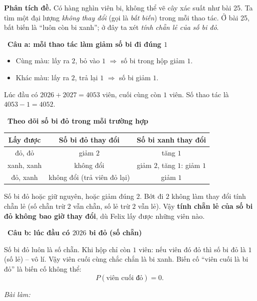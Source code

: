 \documentclass[11pt]{article}
\newif\ifsol \solfalse
\newcommand{\StuProb}[2]{\begin{probboxS}{#1}{#2}\StuProbBody\end{probboxS}}
\newcommand{\probsol}[1]{%
  \begin{lrbox}{\solmeasure}\begin{minipage}{\dimexpr\linewidth-24pt\relax}#1\end{minipage}\end{lrbox}%
  \ifsol
    \begin{solbox}#1\end{solbox}%
  \else
    \setlength{\solht}{\dimexpr\ht\solmeasure+\dp\solmeasure+0.85cm\relax}%
    \ifdim\solht<1.35cm\setlength{\solht}{1.35cm}\fi
    \ifdim\solht>\StudentMaxWork\setlength{\solht}{\StudentMaxWork}\fi
    \par\noindent\begin{minipage}{\linewidth}%
    \expandafter\StuProb\StuProbArgs
    \begin{tcolorbox}[colback=white,colframe=Line,boxrule=0.8pt,arc=5pt,
      left=8pt,right=8pt,top=4pt,bottom=4pt,height=\solht]{\footnotesize\color{Slate}\itshape\WorkWord}\end{tcolorbox}%
    \end{minipage}\par\medskip
  \fi}
\newlength{\StudentMaxWork}\setlength{\StudentMaxWork}{4.5cm}
\newcommand{\step}[2]{\par\smallskip\noindent{\bfseries\color{tmBlue!85!black}\StepWord~#1.}\ {\bfseries #2}\par\nopagebreak}
\def\WorkWord{Bài làm:}
\def\StepWord{Bước}
\begin{document}
\probsol{
\textbf{Phân tích đề.} Có hàng nghìn viên bi, không thể vẽ cây xác suất như bài 25. Ta tìm một đại lượng \emph{không thay đổi} (gọi là
\emph{bất biến}) trong mỗi thao tác. Ở bài 25, bất biến là ``luôn còn bi xanh''; ở đây ta xét \emph{tính chẵn lẻ của số bi đỏ}.

\step{1}{Câu a: mỗi thao tác làm giảm số bi đi đúng $1$}
\begin{itemize}[leftmargin=1.2em,itemsep=1pt,topsep=2pt]
\item Cùng màu: lấy ra $2$, bỏ vào $1$ $\Rightarrow$ số bi trong hộp giảm $1$.
\item Khác màu: lấy ra $2$, trả lại $1$ $\Rightarrow$ số bi giảm $1$.
\end{itemize}
Lúc đầu có $2026+2027=4053$ viên, cuối cùng còn $1$ viên. Số thao tác là $4053-1=4052$.

\step{2}{Theo dõi số bi đỏ trong mỗi trường hợp}
\begin{center}\begin{tabular}{|c|c|c|}\hline
Lấy được & Số bi đỏ thay đổi & Số bi xanh thay đổi\\\hline
đỏ, đỏ & giảm $2$ & tăng $1$\\\hline
xanh, xanh & không đổi & giảm $2$, tăng $1$: giảm $1$\\\hline
đỏ, xanh & không đổi (trả viên đỏ lại) & giảm $1$\\\hline
\end{tabular}\end{center}
\begin{proofbox}Số bi đỏ hoặc giữ nguyên, hoặc giảm đúng $2$. Bớt đi $2$ không làm thay đổi tính chẵn lẻ (số chẵn trừ $2$ vẫn chẵn,
số lẻ trừ $2$ vẫn lẻ). Vậy \textbf{tính chẵn lẻ của số bi đỏ không bao giờ thay đổi}, dù Felix lấy được những viên nào.\end{proofbox}

\step{3}{Câu b: lúc đầu có $2026$ bi đỏ (số chẵn)}
Số bi đỏ luôn là số chẵn. Khi hộp chỉ còn $1$ viên: nếu viên đó đỏ thì số bi đỏ là $1$ (số lẻ) -- vô lí. Vậy viên cuối cùng chắc chắn
là bi xanh. Biến cố ``viên cuối là bi đỏ'' là biến cố không thể:
\[P(\text{viên cuối đỏ})=0.\]

}
\end{document}
